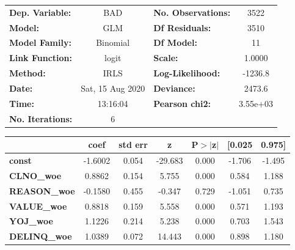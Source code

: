 \begin{figure}
\begin{center}
\begin{tabular}{lclc}
\toprule
\textbf{Dep. Variable:}  &       BAD        & \textbf{  No. Observations:  } &     3522    \\
\textbf{Model:}          &       GLM        & \textbf{  Df Residuals:      } &     3510    \\
\textbf{Model Family:}   &     Binomial     & \textbf{  Df Model:          } &       11    \\
\textbf{Link Function:}  &      logit       & \textbf{  Scale:             } &    1.0000   \\
\textbf{Method:}         &       IRLS       & \textbf{  Log-Likelihood:    } &   -1236.8   \\
\textbf{Date:}           & Sat, 15 Aug 2020 & \textbf{  Deviance:          } &    2473.6   \\
\textbf{Time:}           &     13:16:04     & \textbf{  Pearson chi2:      } &  3.55e+03   \\
\textbf{No. Iterations:} &        6         & \textbf{                     } &             \\
\bottomrule
\end{tabular}
\begin{tabular}{lcccccc}
                      & \textbf{coef} & \textbf{std err} & \textbf{z} & \textbf{P$> |$z$|$} & \textbf{[0.025} & \textbf{0.975]}  \\
\midrule
\textbf{const}        &      -1.6002  &        0.054     &   -29.683  &         0.000        &       -1.706    &       -1.495     \\
\textbf{CLNO\_woe}    &       0.8862  &        0.154     &     5.755  &         0.000        &        0.584    &        1.188     \\
\textbf{REASON\_woe}  &      -0.1580  &        0.455     &    -0.347  &         0.729        &       -1.051    &        0.735     \\
\textbf{VALUE\_woe}   &       0.8818  &        0.159     &     5.558  &         0.000        &        0.571    &        1.193     \\
\textbf{YOJ\_woe}     &       1.1226  &        0.214     &     5.238  &         0.000        &        0.703    &        1.543     \\
\textbf{DELINQ\_woe}  &       1.0389  &        0.072     &    14.443  &         0.000        &        0.898    &        1.180     \\

\end{tabular}
\end{center}
\end{figure}
